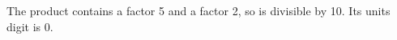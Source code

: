 The product contains a factor 5 and a factor 2, so is divisible by 10. Its units digit is $\boxed0$.
